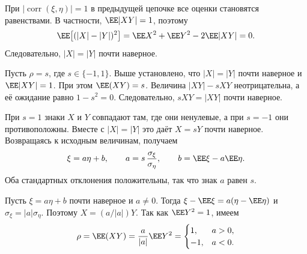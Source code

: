 \begin{Proof}
При $|\operatorname{corr}(\xi,\eta)|=1$ в предыдущей цепочке все оценки
становятся равенствами. В частности, $\EE|XY|=1$, поэтому
\[
 \EE\bigl[(|X|-|Y|)^2\bigr]
 =\EE X^2+\EE Y^2-2\EE|XY|=0.
\]
Следовательно, $|X|=|Y|$ почти наверное.
\end{Proof}
\begin{Proof}
Пусть $\rho=s$, где $s\in\{-1,1\}$. Выше установлено, что
$|X|=|Y|$ почти наверное и $\EE|XY|=1$. При этом $\EE(XY)=s$.
Величина $|XY|-sXY$ неотрицательна, а её ожидание равно $1-s^2=0$.
Следовательно, $sXY=|XY|$ почти наверное.

\smallskip
При $s=1$ знаки $X$ и $Y$ совпадают там, где они ненулевые,
а при $s=-1$ они противоположны. Вместе с $|X|=|Y|$ это даёт
$X=sY$ почти наверное. Возвращаясь к исходным величинам, получаем
\[
 \xi=a\eta+b,\qquad
 a=s\,\frac{\sigma_\xi}{\sigma_\eta},\qquad b=\EE\xi-a\EE\eta.
\]
Оба стандартных отклонения положительны, так что знак $a$ равен $s$.
\end{Proof}
\begin{Proof}
Пусть $\xi=a\eta+b$ почти наверное и $a\ne0$. Тогда
$\xi-\EE\xi=a(\eta-\EE\eta)$ и $\sigma_\xi=|a|\sigma_\eta$.
Поэтому $X=(a/|a|)Y$. Так как $\EE Y^2=1$, имеем
\[
 \rho=\EE(XY)=\frac{a}{|a|}\EE Y^2
 =\begin{cases}1,&a>0,\\-1,&a<0.\end{cases}
\]
\end{Proof}
